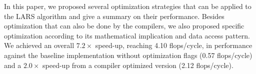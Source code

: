 In this paper, we proposed several optimization strategies that can be applied to the LARS algorithm and give a summary on their performance.
Besides optimization that can also be done by the compilers, we also proposed specific optimization according to its mathematical implication and data access pattern.
We achieved an overall $7.2\times$ speed-up, reaching 4.10 flops/cycle, in performance against the baseline implementation without optimization flags (0.57 flops/cycle) and a $2.0\times$ speed-up from a compiler optimized version (2.12 flops/cycle).






